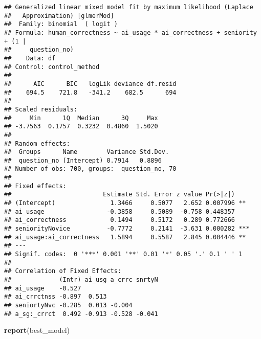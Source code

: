 \documentclass[
]{article}
\newenvironment{Shaded}{\begin{snugshade}}{\end{snugshade}}
\newcommand{\FunctionTok}[1]{\textcolor[rgb]{0.13,0.29,0.53}{\textbf{#1}}}
\newcommand{\NormalTok}[1]{#1}
\begin{document}
\begin{verbatim}
## Generalized linear mixed model fit by maximum likelihood (Laplace
##   Approximation) [glmerMod]
##  Family: binomial  ( logit )
## Formula: human_correctness ~ ai_usage * ai_correctness + seniority + (1 |  
##     question_no)
##    Data: df
## Control: control_method
## 
##      AIC      BIC   logLik deviance df.resid 
##    694.5    721.8   -341.2    682.5      694 
## 
## Scaled residuals: 
##     Min      1Q  Median      3Q     Max 
## -3.7563  0.1757  0.3232  0.4860  1.5020 
## 
## Random effects:
##  Groups      Name        Variance Std.Dev.
##  question_no (Intercept) 0.7914   0.8896  
## Number of obs: 700, groups:  question_no, 70
## 
## Fixed effects:
##                         Estimate Std. Error z value Pr(>|z|)    
## (Intercept)               1.3466     0.5077   2.652 0.007996 ** 
## ai_usage                 -0.3858     0.5089  -0.758 0.448357    
## ai_correctness            0.1494     0.5172   0.289 0.772666    
## seniorityNovice          -0.7772     0.2141  -3.631 0.000282 ***
## ai_usage:ai_correctness   1.5894     0.5587   2.845 0.004446 ** 
## ---
## Signif. codes:  0 '***' 0.001 '**' 0.01 '*' 0.05 '.' 0.1 ' ' 1
## 
## Correlation of Fixed Effects:
##             (Intr) ai_usg a_crrc snrtyN
## ai_usage    -0.527                     
## ai_crrctnss -0.897  0.513              
## seniortyNvc -0.285  0.013 -0.004       
## a_sg:_crrct  0.492 -0.913 -0.528 -0.041
\end{verbatim}

\begin{Shaded}
\begin{Highlighting}[]
\FunctionTok{report}\NormalTok{(best\_model)}
\end{Highlighting}
\end{Shaded}
\end{document}
